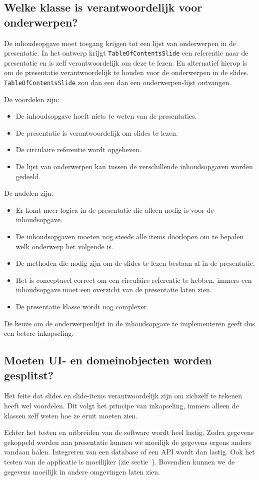\documentclass[a4paper]{article}
\newcommand{\question}[1]{
  \subsection{#1}
}
\newcommand{\code}[1]{\lstinline[columns=fixed]{#1}}
\begin{document}
    \question{Welke klasse is verantwoordelijk voor onderwerpen?}
    De inhoudsopgave moet toegang krijgen tot een lijst van onderwerpen in de presentatie.
    In het ontwerp krijgt \code{TableOfContentsSlide} een referentie naar de presentatie en is zelf verantwoordelijk om deze te lezen.
    En alternatief hierop is om de presentatie verantwoordelijk te houden voor de onderwerpen in de slides.
    \code{TableOfContentsSlide} zou dan een dan een onderwerpen-lijst ontvangen.

    De voordelen zijn:
    \begin{itemize}
        \item De inhoudsopgave hoeft niets te weten van de presentaties.
        \item De presentatie is verantwoordelijk om slides te lezen.
        \item De circulaire referentie wordt opgeheven.
        \item De lijst van onderwerpen kan tussen de verschillende inhoudsopgaven worden gedeeld.
    \end{itemize}

    De nadelen zijn:
    \begin{itemize}
        \item Er komt meer logica in de presentatie die alleen nodig is voor de in\-houds\-op\-gave.
        \item De inhoudsopgaven moeten nog steeds alle items doorlopen om te bepalen welk onderwerp het volgende is.
        \item De methoden die nodig zijn om de slides te lezen bestaan al in de presentatie.
        \item Het is conceptueel correct om een circulaire referentie te hebben, immers een inhoudsopgave moet een overzicht van de presentatie laten zien.
        \item De presentatie klasse wordt nog complexer.
    \end{itemize}
    
    De keuze om de onderwerpenlijst in de inhoudsopgave te implementeren geeft dus een betere inkapseling.

    \question{Moeten UI- en domeinobjecten worden gesplitst?}
    \label{q:ui-domein-vermenging}
    Het feite dat slides en slide-items verantwoordelijk zijn om zichzelf te tekenen heeft wel voordelen.
    Dit volgt het principe van inkapseling, immers alleen de klassen zelf weten hoe ze eruit moeten zien.

    Echter het testen en uitbreiden van de software wordt heel lastig.
    Zodra gegevens gekoppeld worden aan presentatie kunnen we moeilijk de gegevens ergens anders vandaan halen.
    Integreren van een database of een API wordt dan lastig.
    Ook het testen van de applicatie is moeilijker (zie sectie~).
    Bovendien kunnen we de gegevens moeilijk in andere omgevingen laten zien.
    
\end{document}

